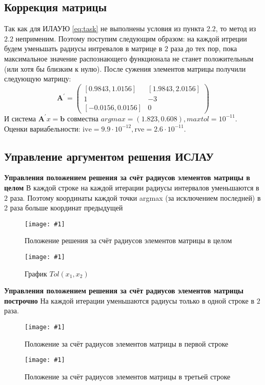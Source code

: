 \documentclass[a4paper,12pt]{article}
\newcommand{\plot}[3]{
    \begin{figure}[H]
        \texttt{[image: \#1]}
        \caption{#2}
        \label{#3}
    \end{figure}
}
\begin{document}
    \subsection{Коррекция матрицы}
    Так как для ИЛАУЮ \ref{eq:task} не выполнены условия из пункта $ 2.2 $, то метод из $ 2.2 $ неприменим.
    Поэтому поступим следующим образом: на каждой итреции будем уменьшать радиусы интревалов в матрице в $ 2 $ раза до тех пор, пока максимальное значение распознающего функционала не станет положительным (или хотя бы близким к нулю).
    После сужения элементов матрицы получили следующую матрицу:
    \begin{equation}
        \textbf{A}^{'} = \begin{pmatrix}
            [0.9843, 1.0156] & [1.9843, 2.0156] \\
            1 & -3 \\
            [-0.0156, 0.0156] & 0
        \end{pmatrix}
    \end{equation}
    И система $ \textbf{A}^{'}x = \textbf{b} $ совместна $ argmax = (1.823, 0.608), maxtol = 10^{-11} $. \newline
    Оценки вариабельности: \newline
    $ \text{ive} = 9.9 \cdot 10^{-12}, \text{rve} = 2.6 \cdot 10^{-11} $.

    \subsection{Управление аргументом решения ИСЛАУ}
    \textbf{Управления положением решения за счёт радиусов элементов матрицы в целом} \newline
    В каждой строке на каждой итерации радиусы интервалов уменьшаются в $ 2 $ раза. Поэтому координаты каждой точки argmax (за исключением последней) в 2 раза больше координат предыдущей
    \plot{MatrixCorrection}{Положение решения за счёт радиусов элементов матрицы в целом}{p:matrixcorrection}
    
    \plot{tol}{График $ Tol(x_1, x_2) $}{p:matrixcorrection}
    \newpage

    \noindent
    \textbf{Управления положением решения за счёт радиусов элементов матрицы построчно} \newline
    На каждой итерации уменьшаются радиусы только в одной строке в $ 2 $ раза.
    \plot{MatrixCorrectionByLine0}{Положение за счёт радиусов элементов матрицы в первой строке}{p:matrixcorrectionbyline0}
    \plot{MatrixCorrectionByLine2}{Положение за счёт радиусов элементов матрицы в третьей строке}{p:matrixcorrectionbyline2}
\end{document}
